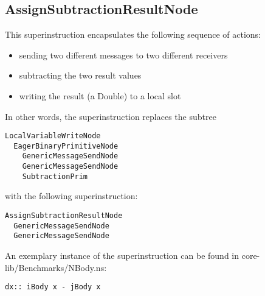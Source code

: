 \documentclass[10pt,a4paper]{article}
\begin{document}
\subsection{AssignSubtractionResultNode}

This superinstruction encapsulates the following sequence of actions:

\begin{itemize}
	\item sending two different messages to two different receivers
	\item subtracting the two result values
	\item writing the result (a Double) to a local slot
\end{itemize}
In other words, the superinstruction replaces the subtree
\begin{verbatim}
LocalVariableWriteNode
  EagerBinaryPrimitiveNode
    GenericMessageSendNode
    GenericMessageSendNode
    SubtractionPrim
\end{verbatim}
with the following superinstruction:
\begin{verbatim}
AssignSubtractionResultNode
  GenericMessageSendNode
  GenericMessageSendNode
\end{verbatim}
An exemplary instance of the superinstruction can be found in \textsf{core-lib/Benchmarks/NBody.ns}:
\begin{verbatim}
dx:: iBody x - jBody x
\end{verbatim}
\end{document}
